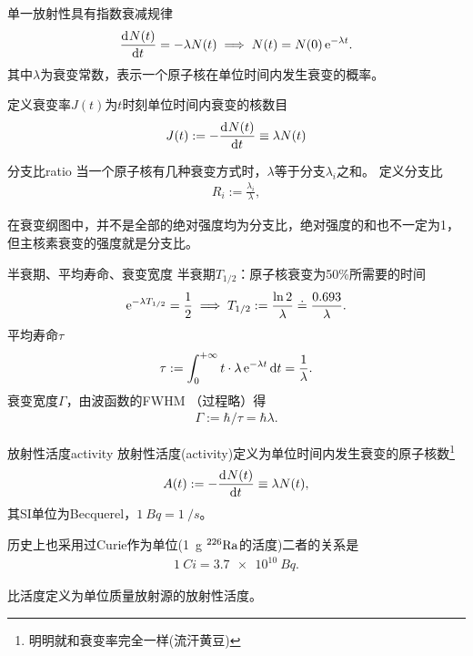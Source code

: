 单一放射性具有指数衰减规律
\begin{align}
	\frac{\mathrm{d}^{{}}N(t)}{\mathrm{d}{t}^{{}}}=-\lambda N(t)\implies N(t)=N(0)\mathop{}\!\mathrm{e}^{-\lambda t}.
\end{align}
其中$\lambda$为衰变常数，表示一个原子核在单位时间内发生衰变的概率。

定义衰变率$J(t)$为$t$时刻单位时间内衰变的核数目
\[
	J(t):=-\frac{\mathrm{d}^{{}}N(t)}{\mathrm{d}{t}^{{}}}\equiv\lambda N(t)
\]
\begin{definition}{分支比}{ratio}
	当一个原子核有几种衰变方式时，$\lambda$等于分支$\lambda_i$之和。
	定义分支比
	\begin{align}
		R_i:=\frac{\lambda_i}\lambda,
	\end{align}
\end{definition}
在衰变纲图中，并不是全部的绝对强度均为分支比，绝对强度的和也不一定为1，但主核素衰变的强度就是分支比。
\begin{definition}{半衰期、平均寿命、衰变宽度}{}
	半衰期$T_{1/2}$：原子核衰变为50\%所需要的时间
	\begin{align}
		\mathop{}\!\mathrm{e}^{-\lambda T_{1/2}}=\frac12\implies T_{1/2}:=\frac{\ln 2}\lambda\doteq\frac{0.693}\lambda.
	\end{align}
	平均寿命$\tau$
	\begin{align}
		\tau:=\int_0^{+\infty} t\cdot\lambda\mathop{}\!\mathrm{e}^{-\lambda t}\mathop{}\!\mathrm{d} t=\frac1\lambda.
	\end{align}
	衰变宽度$\varGamma$，由波函数的FWHM （过程略）得
	\begin{align}
		\varGamma:=\hbar/\tau=\hbar\lambda.
	\end{align}
\end{definition}
\begin{definition}{放射性活度}{activity}
	放射性活度(activity)定义为单位时间内发生衰变的原子核数\footnote{明明就和衰变率完全一样(流汗黄豆)}
	\begin{align}
		A(t):=-\frac{\mathrm{d}^{{}}N(t)}{\mathrm{d}{t}^{{}}}\equiv\lambda N(t),
	\end{align}
	其SI单位为Becquerel，$\SI{1}{Bq}=\SI{1}{\per s}$。
\end{definition}
历史上也采用过Curie作为单位(\SI{1}{g} ${^{226}\mathrm{Ra}}$的活度)二者的关系是
\begin{align}
	\SI{1}{Ci}=\SI{3.7e10}{Bq}.
\end{align}


比活度定义为单位质量放射源的放射性活度。

